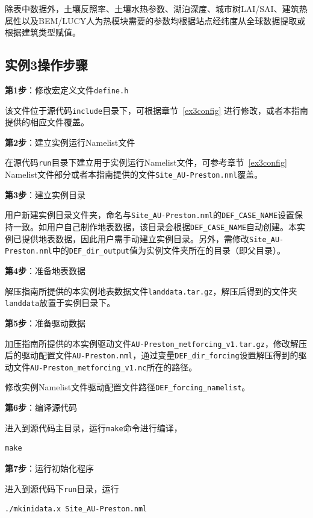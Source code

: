 除表中数据外，土壤反照率、土壤水热参数、湖泊深度、城市树LAI/SAI、建筑热属性以及BEM/LUCY人为热模块需要的参数均根据站点经纬度从全球数据提取或根据建筑类型赋值。

\subsection{实例3操作步骤}

\textbf{第1步}：修改宏定义文件\texttt{define.h}

该文件位于源代码\texttt{include}目录下，可根据章节~\ref{ex3config} 进行修改，或者本指南提供的相应文件覆盖。

\bigskip
\textbf{第2步}：建立实例运行Namelist文件

在源代码\texttt{run}目录下建立用于实例运行Namelist文件，可参考章节~\ref{ex3config} Namelist文件部分或者本指南提供的文件\texttt{Site\_AU-Preston.nml}覆盖。

\bigskip
\textbf{第3步}：建立实例目录

用户新建实例目录文件夹，命名与\texttt{Site\_AU-Preston.nml}的\texttt{DEF\_CASE\_NAME}设置保持一致。如用户自己制作地表数据，该目录会根据\texttt{DEF\_CASE\_NAME}自动创建。本实例已提供地表数据，因此用户需手动建立实例目录。另外，需修改\texttt{Site\_AU-Preston.nml}中的\texttt{DEF\_dir\_output}值为实例文件夹所在的目录（即父目录）。

\bigskip
\textbf{第4步}：准备地表数据

解压指南所提供的本实例地表数据文件\texttt{landdata.tar.gz}，解压后得到的文件夹\texttt{landdata}放置于实例目录下。

\bigskip
\textbf{第5步}：准备驱动数据

加压指南所提供的本实例驱动文件\texttt{AU-Preston\_metforcing\_v1.tar.gz}，修改解压后的驱动配置文件\texttt{AU-Preston.nml}，通过变量\texttt{DEF\_dir\_forcing}设置解压得到的驱动文件\texttt{AU-Preston\_metforcing\_v1.nc}所在的路径。

修改实例Namelist文件驱动配置文件路径\texttt{DEF\_forcing\_namelist}。

\bigskip
\textbf{第6步}：编译源代码

进入到源代码主目录，运行\texttt{make}命令进行编译，
\begin{lstlisting}
make
\end{lstlisting}

\bigskip
\textbf{第7步}：运行初始化程序

进入到源代码下\texttt{run}目录，运行
\begin{lstlisting}
./mkinidata.x Site_AU-Preston.nml
\end{lstlisting}

